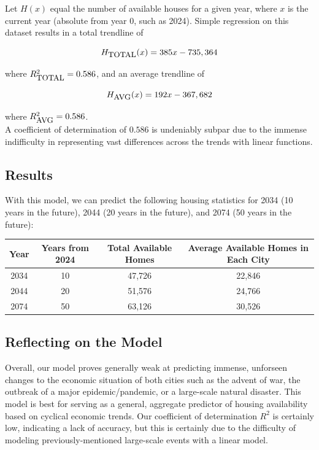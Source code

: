 \documentclass[12pt]{article}
\begin{document}
\noindent
Let $H(x)$ equal the number of available houses for a given year, where $x$ is the current year (absolute from year 0, such as 2024). Simple regression on this dataset results in a total trendline of

$$H_{\textrm{\small TOTAL}}(x) = 385x - 735,364$$

\noindent
where $R^{2}_{\textrm{\small TOTAL}} = 0.586$, and an average trendline of

$$H_{\textrm{\small AVG}}(x) = 192x - 367,682$$

\noindent
where $R^{2}_{\textrm{\small AVG}} = 0.586$. \\

\noindent
A coefficient of determination of $0.586$ is undeniably subpar due to the immense indifficulty in representing vast differences across the trends with linear functions.

\subsection{Results}

With this model, we can predict the following housing statistics for 2034 (10 years in the future), 2044 (20 years in the future), and 2074 (50 years in the future):

\begin{table}[H]
  \centering
  \begin{tabular}{|c c|c c|}
    \hline
    Year & Years from 2024 & Total Available Homes & Average Available Homes in Each City \\
    \hline
    2034 & 10 & 47,726 & 22,846 \\
    2044 & 20 & 51,576 & 24,766 \\
    2074 & 50 & 63,126 & 30,526 \\
    \hline
  \end{tabular}
\end{table}

\subsection{Reflecting on the Model}

Overall, our model proves generally weak at predicting immense, unforseen changes to the economic situation of both cities such as the advent of war, the outbreak of a major epidemic/pandemic, or a large-scale natural disaster. This model is best for serving as a general, aggregate predictor of housing availability based on cyclical economic trends. Our coefficient of determination $R^{2}$ is certainly low, indicating a lack of accuracy, but this is certainly due to the difficulty of modeling previously-mentioned large-scale events with a linear model. \\ 
\end{document}
